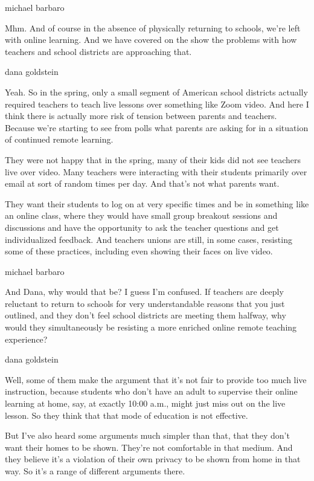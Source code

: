 michael barbaro

Mhm. And of course in the absence of physically returning to schools,
we're left with online learning. And we have covered on the show the
problems with how teachers and school districts are approaching that.

dana goldstein

Yeah. So in the spring, only a small segment of American school
districts actually required teachers to teach live lessons over
something like Zoom video. And here I think there is actually more risk
of tension between parents and teachers. Because we're starting to see
from polls what parents are asking for in a situation of continued
remote learning.

They were not happy that in the spring, many of their kids did not see
teachers live over video. Many teachers were interacting with their
students primarily over email at sort of random times per day. And
that's not what parents want.

They want their students to log on at very specific times and be in
something like an online class, where they would have small group
breakout sessions and discussions and have the opportunity to ask the
teacher questions and get individualized feedback. And teachers unions
are still, in some cases, resisting some of these practices, including
even showing their faces on live video.

michael barbaro

And Dana, why would that be? I guess I'm confused. If teachers are
deeply reluctant to return to schools for very understandable reasons
that you just outlined, and they don't feel school districts are meeting
them halfway, why would they simultaneously be resisting a more enriched
online remote teaching experience?

dana goldstein

Well, some of them make the argument that it's not fair to provide too
much live instruction, because students who don't have an adult to
supervise their online learning at home, say, at exactly 10:00 a.m.,
might just miss out on the live lesson. So they think that that mode of
education is not effective.

But I've also heard some arguments much simpler than that, that they
don't want their homes to be shown. They're not comfortable in that
medium. And they believe it's a violation of their own privacy to be
shown from home in that way. So it's a range of different arguments
there.

